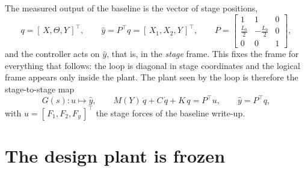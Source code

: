 \documentclass[11pt]{article}
\newcommand{\yh}{\hat{y}}
\begin{document}
The measured output of the baseline is the vector of stage positions,
\begin{equation}
  q = [\,X,\Theta,Y\,]^\top , \qquad
  \yh = P^\top q = [\,X_1,X_2,Y\,]^\top , \qquad
  P =
  \begin{bmatrix}
    1 & 1 & 0 \\[1mm]
    \tfrac{L_b}{2} & -\tfrac{L_b}{2} & 0 \\[1mm]
    0 & 0 & 1
  \end{bmatrix} ,
  \label{eq:frame}
\end{equation}
and the controller acts on $\yh$, that is, in the \emph{stage} frame. This fixes the frame for
everything that follows: the loop is diagonal in stage coordinates and the logical frame appears
only inside the plant. The plant seen by the loop is therefore the stage-to-stage map
\begin{equation}
  G(s) : u \mapsto \yh , \qquad
  M(Y)\,\ddot q + C\,\dot q + K\,q = P^\top u , \qquad \yh = P^\top q ,
  \label{eq:plant}
\end{equation}
with $u = [\,F_1,F_2,F_y\,]^\top$ the stage forces of the baseline write-up.

\section{The design plant is frozen}
\end{document}
